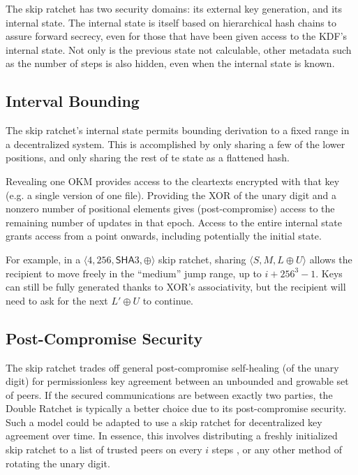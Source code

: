\documentclass{article}
\begin{document}
	The skip ratchet has two security domains: its external key generation, and its internal state. The internal state is itself based on hierarchical hash chains to assure forward secrecy, even for those that have been given access to the KDF's internal state. Not only is the previous state not calculable, other metadata such as the number of steps is also hidden, even when the internal state is known.
	
	\subsection{Interval Bounding}
	
	The skip ratchet's internal state permits bounding derivation to a fixed range in a decentralized system. This is accomplished by only sharing a few of the lower positions, and only sharing the rest of te state as a flattened hash.
	
	Revealing one OKM provides access to the cleartexts encrypted with that key (e.g. a single version of one file). Providing the \textsf{XOR} of the unary digit and a nonzero number of positional elements gives (post-compromise) access to the remaining number of updates in that epoch. Access to the entire internal state grants access from a point onwards, including potentially the initial state.
	
	For example, in a $\langle 4, 256, \textsf{SHA}3, \oplus \rangle$ skip ratchet, sharing $\langle S, M, L \oplus U \rangle$ allows the recipient to move freely in the ``medium'' jump range, up to $i + 256^{3} - 1$. Keys can still be fully generated thanks to \textsf{XOR}'s associativity, but the recipient will need to ask for the next $L' \oplus U$ to continue.
	
	\subsection{Post-Compromise Security}
	
	The skip ratchet trades off general post-compromise self-healing (of the unary digit) for permissionless key agreement between an unbounded and growable set of peers. If the secured communications are between exactly two parties, the Double Ratchet is typically a better choice due to its post-compromise security. Such a model could be adapted to use a skip ratchet for decentralized key agreement over time. In essence, this involves distributing a freshly initialized skip ratchet to a list of trusted peers on every $i$ steps \cite{decentralized-key-agreement}, or any other method of rotating the unary digit.
	
\end{document}
